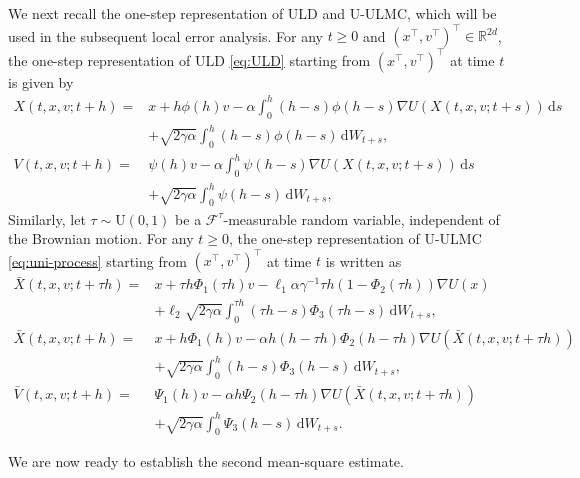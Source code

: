 \documentclass[12pt]{article}
\numberwithin{equation}{section}
\newcommand{\X}{\bar{X}}
\newcommand{\V}{\bar{V}}
\newcommand{\dd}{\mathrm{d}}
\begin{document}
%
We next recall the one-step representation of ULD and U-ULMC, which will be used in the subsequent local error analysis.
%
For any $t\geq0$ and $(x^\top,v^\top)^\top\in\mathbb R^{2d}$, the one-step representation of ULD \eqref{eq:ULD} starting from $(x^\top,v^\top)^\top$ at time $t$ is given by
\begin{equation}
\label{eq:exact-ULD-one-step}
\begin{aligned}
X(t,x,v;t+h)
=&
x
+
h\phi(h)v
-
\alpha
\int_0^{h}
(h-s)\phi(h-s)
\nabla U(X(t,x,v;t+s))\,\mathrm ds
\\
&+
\sqrt{2\gamma\alpha}
\int_0^{h}
(h-s)\phi(h-s)\,\mathrm dW_{t+s},
\\
V(t,x,v;t+h)
=&
\psi(h)v
-
\alpha
\int_0^{h}
\psi(h-s)
\nabla U(X(t,x,v;t+s))\,\mathrm ds
\\
&+
\sqrt{2\gamma\alpha}
\int_0^{h}
\psi(h-s)\,\mathrm dW_{t+s},
\end{aligned}
\end{equation}
Similarly, let $\tau\sim \mathrm{U}(0,1)$ be a $\mathcal{F}^\tau$-measurable random variable, independent of the Brownian motion. 
For any $t\geq0$, the one-step representation of U-ULMC \eqref{eq:uni-process} starting from $(x^\top,v^\top)^\top$ at time $t$ is written as
\begin{equation}\label{eq:unified-approx-ULD-one-step}
\begin{aligned}
\X(t,x,v;t+\tau h)
=&
x
+
\tau h\Phi_1(\tau h)
v
-\ell_1
\alpha
\gamma^{-1}
\tau h
(1-\Phi_2(\tau h))\nabla U(x)
\\
&+
\ell_2
\sqrt{2\gamma \alpha}
\int^{\tau h}_0
(\tau h-s)
\Phi_3(\tau h-s)
\,\dd W_{t+s},
\\
\X(t,x,v;t+h)
=&
x
+
h\Phi_1(h) v
-
\alpha h(h-\tau h)
\Phi_2(h-\tau h)
\nabla U(\X(t,x,v;t+\tau h))
\\
&
+
\sqrt{2\gamma \alpha}
\int^{h}_0 (h-s)
\Phi_3(h-s)\,\dd W_{t+s},
\\
\V(t,x,v;t+h)
=&
\Psi_1(h) v
-
\alpha h \Psi_2(h-\tau h)
\nabla U(\X(t,x,v;t+\tau h))
\\
&+
\sqrt{2\gamma \alpha}
\int^{h}_0
\Psi_3(h-s)
\,\dd W_{t+s}.
\end{aligned}
\end{equation}

We are now ready to establish the second mean-square estimate.
\end{document}
